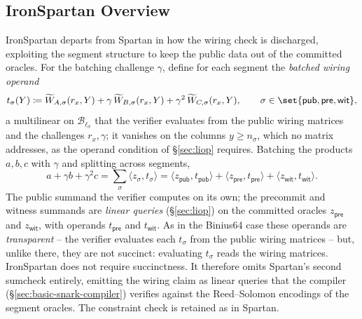 \documentclass{article}
\theoremstyle{definition}
\newcommand*{\mle}{\widetilde}
\newcommand{\BB}{\mathcal{B}}
\begin{document}
\subsection{IronSpartan Overview}
\label{sec:ironspartan-overview}

IronSpartan departs from Spartan in how the wiring check is discharged, exploiting the segment structure to keep the public data out of the committed oracles. For the batching challenge $\gamma$, define for each segment the \emph{batched wiring operand}
\[
  t_\sigma(Y) \coloneqq \mle{W}_{A, \sigma}(r_x, Y) + \gamma\, \mle{W}_{B, \sigma}(r_x, Y) + \gamma^2\, \mle{W}_{C, \sigma}(r_x, Y), \qquad \sigma \in \set{\textsf{pub}, \textsf{pre}, \textsf{wit}},
\]
a multilinear on $\BB_{\ell_\sigma}$ that the verifier evaluates from the public wiring matrices and the challenges $r_x, \gamma$; it vanishes on the columns $y \ge n_\sigma$, which no matrix addresses, as the operand condition of \S\ref{sec:liop} requires. Batching the products $a, b, c$ with $\gamma$ and splitting across segments,
\[
  a + \gamma b + \gamma^2 c = \sum_{\sigma} \langle z_\sigma, t_\sigma \rangle = \langle z_{\textsf{pub}}, t_{\textsf{pub}} \rangle + \langle z_{\textsf{pre}}, t_{\textsf{pre}} \rangle + \langle z_{\textsf{wit}}, t_{\textsf{wit}} \rangle.
\]
The public summand the verifier computes on its own; the precommit and witness summands are \emph{linear queries} (\S\ref{sec:liop}) on the committed oracles $z_{\textsf{pre}}$ and $z_{\textsf{wit}}$, with operands $t_{\textsf{pre}}$ and $t_{\textsf{wit}}$. As in the Binius64 case these operands are \emph{transparent} -- the verifier evaluates each $t_\sigma$ from the public wiring matrices -- but, unlike there, they are not succinct: evaluating $t_\sigma$ reads the wiring matrices. IronSpartan does not require succinctness. It therefore omits Spartan's second sumcheck entirely, emitting the wiring claim as linear queries that the compiler (\S\ref{sec:basic-snark-compiler}) verifies against the Reed--Solomon encodings of the segment oracles. The constraint check is retained as in Spartan.
\end{document}
